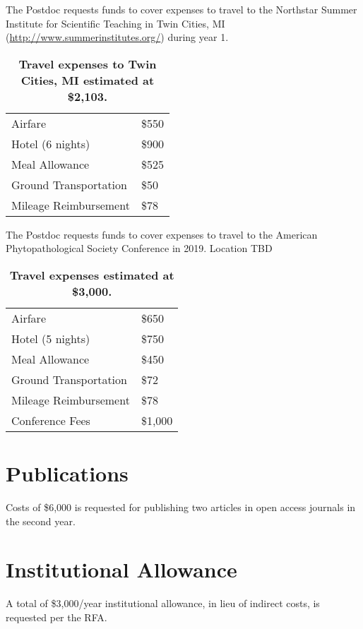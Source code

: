 \documentclass[12pt,letterpaper]{article}
\begin{document}
The Postdoc requests funds to cover expenses to travel to the Northstar Summer Institute for Scientific Teaching in Twin Cities, MI (\url{http://www.summerinstitutes.org/}) during year 1.




\begin{table}[h!]
\centering
\begin{tabular}{ll}
\hline
	Airfare	& \$550 \\
	Hotel (6 nights) 	& \$900 \\
	Meal Allowance	& \$525 \\
	Ground Transportation	& \$50 \\
	Mileage Reimbursement	& \$78 \\\hline
\end{tabular}
\caption{\textbf{Travel expenses to Twin Cities, MI estimated at \$2,103.}}
\end{table}

The Postdoc requests funds to cover expenses to travel to the American Phytopathological Society Conference in 2019.  Location TBD


\begin{table}[h!]
\centering
\begin{tabular}{ll}
\hline
	Airfare	& \$650 \\
	Hotel (5 nights) 	& \$750 \\
	Meal Allowance	& \$450 \\
	Ground Transportation	& \$72 \\
	Mileage Reimbursement	& \$78 \\
	Conference Fees	& \$1,000\\\hline
\end{tabular}
\caption{\textbf{Travel expenses estimated at \$3,000.}}
\end{table}


\section{Publications}
Costs of \$6,000 is requested for publishing two articles in open access journals in the second year.  

\section{Institutional Allowance}
A total of \$3,000/year institutional allowance, in lieu of indirect costs, is requested per the RFA.  
\end{document}
